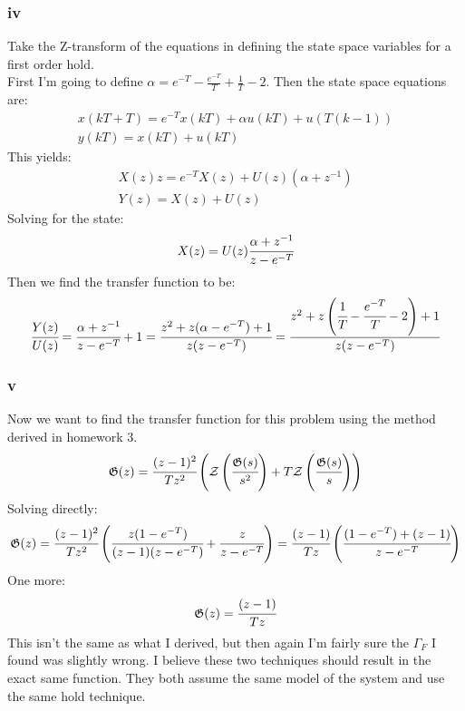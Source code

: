 \documentclass{article}
\begin{document}
\subsubsection*{iv}
Take the Z-transform of the equations in defining the state space variables for a first order hold.\\
First I'm going to define $\alpha=e^{-T}-\frac{e^{-T}}{T}+\frac{1}{T}-2$. Then the state space equations are:
\[\begin{split}x(kT+T)=e^{-T}x(kT)+\alpha u(kT)+u(T(k-1))\\y(kT)=x(kT)+u(kT)\end{split}\]
This yields:
\[\begin{split}X(z)z=e^{-T}X(z)+U(z)(\alpha+z^{-1})\\Y(z)=X(z)+U(z)\end{split}\]
Solving for the state:
\[X(z)=U(z)\cfrac{\alpha+z^{-1}}{z-e^{-T}}\]
Then we find the transfer function to be:
\[\cfrac{Y(z)}{U(z)}=\cfrac{\alpha+z^{-1}}{z-e^{-T}}+1=\cfrac{z^2+z(\alpha-e^{-T})+1}{z(z-e^{-T})}=\cfrac{z^2+z\left(\cfrac{1}{T}-\cfrac{e^{-T}}{T}-2\right )+1}{z(z-e^{-T})}\]

\subsubsection*{v}
Now we want to find the transfer function for this problem using the method derived in homework 3.
\[\mathfrak{G}(z)=\cfrac{(z-1)^2}{Tz^2}\left (\mathcal{Z}\left (\cfrac{\mathfrak{G}(s)}{s^2}\right )+T\mathcal{Z}\left (\cfrac{\mathfrak{G}(s)}{s}\right )\right )\]
Solving directly:
\[\mathfrak{G}(z)=\cfrac{(z-1)^2}{Tz^2}\left (\cfrac{z(1-e^{-T})}{(z-1)(z-e^{-T})}+\cfrac{z}{z-e^{-T}}\right )=\cfrac{(z-1)}{Tz}\left (\cfrac{(1-e^{-T})+(z-1)}{z-e^{-T}}\right )\]
One more:
\[\mathfrak{G}(z)=\cfrac{(z-1)}{Tz}\]
This isn't the same as what I derived, but then again I'm fairly sure the $\Gamma_F$ I found was slightly wrong. I believe these two techniques should result in the exact same function. They both assume the same model of the system and use the same hold technique.
\end{document}
